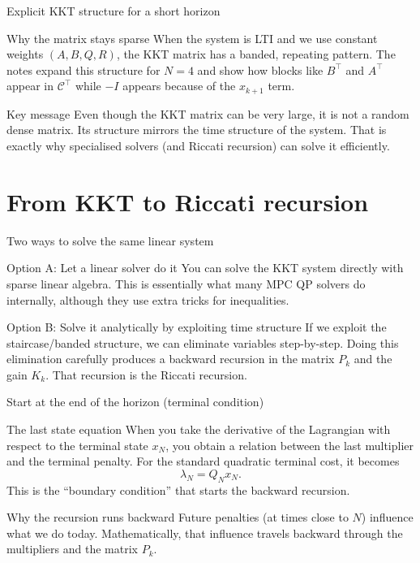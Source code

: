 \documentclass[aspectratio=169,11pt]{beamer}
\begin{document}
\begin{frame}{Explicit KKT structure for a short horizon}
\begin{block}{Why the matrix stays sparse}
When the system is LTI and we use constant weights $(A,B,Q,R)$, the KKT matrix has a banded, repeating pattern.
The notes expand this structure for $N=4$ and show how blocks like $B^\top$ and $A^\top$ appear in $\mathcal{C}^\top$ while $-I$ appears because of the $x_{k+1}$ term.
\end{block}

\begin{alertblock}{Key message}
Even though the KKT matrix can be very large, it is not a random dense matrix. Its structure mirrors the time structure of the system.
That is exactly why specialised solvers (and Riccati recursion) can solve it efficiently.
\end{alertblock}
\end{frame}

\section{From KKT to Riccati recursion}

\begin{frame}{Two ways to solve the same linear system}
\begin{block}{Option A: Let a linear solver do it}
You can solve the KKT system directly with sparse linear algebra. This is essentially what many MPC QP solvers do internally, although they use extra tricks for inequalities.
\end{block}

\begin{block}{Option B: Solve it analytically by exploiting time structure}
If we exploit the staircase/banded structure, we can eliminate variables step-by-step. Doing this elimination carefully produces a backward recursion in the matrix $P_k$ and the gain $K_k$.
That recursion is the Riccati recursion.
\end{block}
\end{frame}

\begin{frame}{Start at the end of the horizon (terminal condition)}
\begin{block}{The last state equation}
When you take the derivative of the Lagrangian with respect to the terminal state $x_N$, you obtain a relation between the last multiplier and the terminal penalty.
For the standard quadratic terminal cost, it becomes
\[
\lambda_N = Q_N x_N.
\]
This is the ``boundary condition'' that starts the backward recursion.
\end{block}

\begin{alertblock}{Why the recursion runs backward}
Future penalties (at times close to $N$) influence what we do today. Mathematically, that influence travels backward through the multipliers and the matrix $P_k$.
\end{alertblock}
\end{frame}
\end{document}
